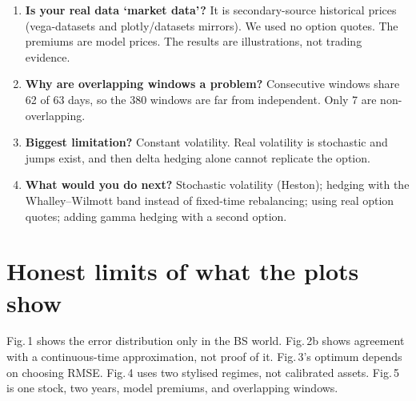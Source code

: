 \documentclass[10.5pt,a4paper]{article}
\begin{document}
\begin{enumerate}[label=\textbf{Q\arabic*.},leftmargin=2.2em]
\item \textbf{Is your real data `market data'?} It is secondary-source historical prices (vega-datasets and plotly/datasets mirrors). We used no option quotes. The premiums are model prices. The results are illustrations, not trading evidence.
\item \textbf{Why are overlapping windows a problem?} Consecutive windows share 62 of 63 days, so the 380 windows are far from independent. Only 7 are non-overlapping.
\item \textbf{Biggest limitation?} Constant volatility. Real volatility is stochastic and jumps exist, and then delta hedging alone cannot replicate the option.
\item \textbf{What would you do next?} Stochastic volatility (Heston); hedging with the Whalley--Wilmott band instead of fixed-time rebalancing; using real option quotes; adding gamma hedging with a second option.
\end{enumerate}

\section{Honest limits of what the plots show}
Fig.\,1 shows the error distribution only in the BS world. Fig.\,2b shows agreement with a continuous-time approximation, not proof of it. Fig.\,3's optimum depends on choosing RMSE.
Fig.\,4 uses two stylised regimes, not calibrated assets. Fig.\,5 is one stock, two years, model premiums, and overlapping windows.
\end{document}
